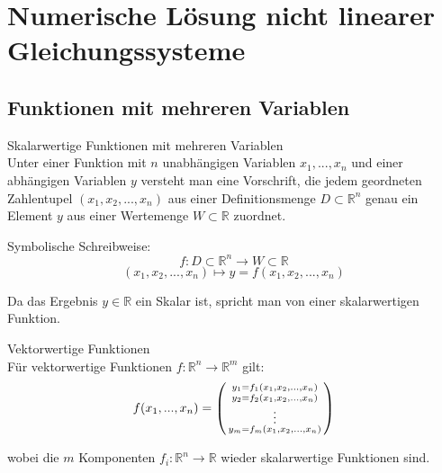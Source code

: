 \section{Numerische Lösung nicht linearer Gleichungssysteme}

\subsection{Funktionen mit mehreren Variablen}

\begin{definition}{Skalarwertige Funktionen mit mehreren Variablen}\\
Unter einer Funktion mit $n$ unabhängigen Variablen $x_1, ..., x_n$ und einer abhängigen Variablen $y$ versteht man eine Vorschrift, die jedem geordneten Zahlentupel $(x_1, x_2, ..., x_n)$ aus einer Definitionsmenge $D \subset \mathbb{R}^n$ genau ein Element $y$ aus einer Wertemenge $W \subset \mathbb{R}$ zuordnet.

Symbolische Schreibweise:
$$f: D \subset \mathbb{R}^n \rightarrow W \subset \mathbb{R}$$
$$(x_1, x_2, ..., x_n) \mapsto y = f(x_1, x_2, ..., x_n)$$

Da das Ergebnis $y \in \mathbb{R}$ ein Skalar ist, spricht man von einer skalarwertigen Funktion.
\end{definition}

\begin{concept}{Vektorwertige Funktionen}\\
Für vektorwertige Funktionen $f: \mathbb{R}^n \rightarrow \mathbb{R}^m$ gilt:
$$f(x_1, ..., x_n) = \begin{psmallmatrix}
y_1 = f_1(x_1, x_2, ..., x_n) \\
y_2 = f_2(x_1, x_2, ..., x_n) \\
\vdots \\
y_m = f_m(x_1, x_2, ..., x_n)
\end{psmallmatrix}$$

wobei die $m$ Komponenten $f_i: \mathbb{R}^n \rightarrow \mathbb{R}$ wieder skalarwertige Funktionen sind.
\end{concept}

